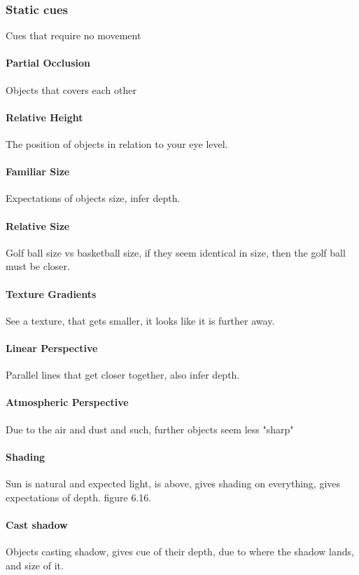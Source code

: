 		\subsubsection{Static cues}
			Cues that require no movement
			\paragraph{Partial Occlusion}
				Objects that covers each other
			\paragraph{Relative Height}
				The position of objects in relation to your eye level.
			\paragraph{Familiar Size}
				Expectations of objects size, infer depth.
			\paragraph{Relative Size}
				Golf ball size vs basketball size, if they seem identical in size, then the golf ball must be closer.
			\paragraph{Texture Gradients}
				See a texture, that gets smaller, it looks like it is further away.
			\paragraph{Linear Perspective}
				Parallel lines that get closer together, also infer depth.
			\paragraph{Atmospheric Perspective}
				Due to the air and dust and such, further objects seem less "sharp"
			\paragraph{Shading}
				Sun is natural and expected light, is above, gives shading on everything, gives expectations of depth. figure 6.16.
			\paragraph{Cast shadow}
				Objects casting shadow, gives cue of their depth, due to where the shadow lands, and size of it.
